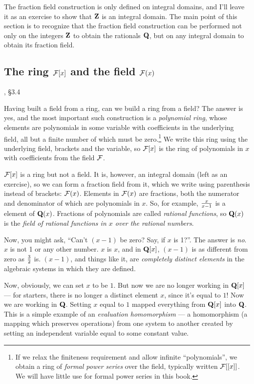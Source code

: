 The fraction field construction is only defined on integral domains,
and I'll leave it as an exercise to show that ${\bf Z}$ is an integral
domain.  The main point of this section is to recognize that the
fraction field construction can be performed not only on the integers
${\bf Z}$ to obtain the rationals ${\bf Q}$, but on any integral
domain to obtain its fraction field.

\vfill\eject

\subsection*{\qquad The ring ${\cal F}[x]$ and the field ${\cal F}(x)$}
, \S3.4

Having built a field from a ring, can we build a ring from a field?
The answer is yes, and the most important such construction is a {\it
polynomial ring}, whose elements are polynomials in some variable with
coefficients in the underlying field, all but a finite number of which
must be zero.\footnote{If we relax the finiteness requirement and
allow infinite ``polynomials'', we obtain a ring of {\it formal power series}
over the field, typically written ${\cal F}[[x]]$.  We will have
little use for formal power series in this book.}  We write this ring using
the underlying field, brackets and the variable, so ${\cal F}[x]$ is
the ring of polynomials in $x$ with coefficients from the field ${\cal
F}$.

${\cal F}[x]$ is a ring but not a field.  It is, however, an
integral domain (left as an exercise), so we can form a fraction field
from it, which we write using parenthesis instead of brackets: ${\cal
F}(x)$.  Elements in ${\cal F}(x)$ are fractions, both the numerator
and denominator of which are polynomials in $x$.  So, for example,
${x}\over{x-1}$ is a element of ${\bf Q}(x)$.  Fractions of
polynomials are called {\it rational functions}, so ${\bf Q}(x)$ is
the {\it field of rational functions in $x$ over the rational numbers}.

Now, you might ask, ``Can't $(x-1)$ be zero?  Say, if $x$ is 1?''.
The answer is {\it no}.  $x$ is not 1 or any other number.  $x$ is
$x$, and in ${\bf Q}[x]$, $(x-1)$ is as different from zero as $3
\over 2$ is.  $(x-1)$, and things like it, are {\it
completely distinct elements} in the algebraic systems in which they
are defined.

Now, obviously, we can set $x$ to be $1$.  But now we are no longer
working in ${\bf Q}[x]$ --- for starters, there is no longer a
distinct element $x$, since it's equal to $1$!  Now we are working in
${\bf Q}$.  Setting $x$ equal to $1$ mapped everything from ${\bf
Q}[x]$ into ${\bf Q}$.  This is a simple example of an {\it evaluation
homomorphism} --- a homomorphism (a mapping which preserves
operations) from one system to another created by setting an
independent variable equal to some constant value.

